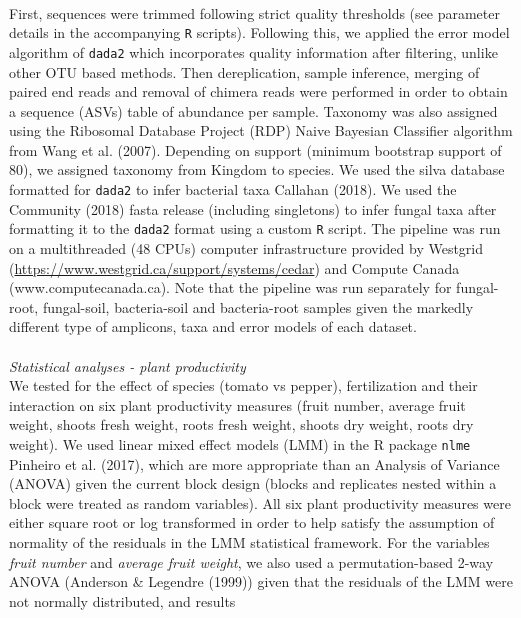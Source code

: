 \documentclass[11pt,]{article}
\begin{document}
\hspace*{0.333em}\\
First, sequences were trimmed following strict quality thresholds (see
parameter details in the accompanying \texttt{R} scripts). Following
this, we applied the error model algorithm of \texttt{dada2} which
incorporates quality information after filtering, unlike other OTU based
methods. Then dereplication, sample inference, merging of paired end
reads and removal of chimera reads were performed in order to obtain a
sequence (ASVs) table of abundance per sample. Taxonomy was also
assigned using the Ribosomal Database Project (RDP) Naive Bayesian
Classifier algorithm from Wang et al. (2007). Depending on support
(minimum bootstrap support of 80), we assigned taxonomy from Kingdom to
species. We used the silva database formatted for \texttt{dada2} to
infer bacterial taxa Callahan (2018). We used the Community (2018) fasta
release (including singletons) to infer fungal taxa after formatting it
to the \texttt{dada2} format using a custom \texttt{R} script. The
pipeline was run on a multithreaded (48 CPUs) computer infrastructure
provided by Westgrid
(\url{https://www.westgrid.ca/support/systems/cedar}) and Compute Canada
(www.computecanada.ca). Note that the pipeline was run separately for
fungal-root, fungal-soil, bacteria-soil and bacteria-root samples given
the markedly different type of amplicons, taxa and error models of each
dataset. ~\\
\hspace*{0.333em}\\
\emph{Statistical analyses - plant productivity}\\
We tested for the effect of species (tomato vs pepper), fertilization
and their interaction on six plant productivity measures (fruit number,
average fruit weight, shoots fresh weight, roots fresh weight, shoots
dry weight, roots dry weight). We used linear mixed effect models (LMM)
in the R package \texttt{nlme} Pinheiro et al. (2017), which are more
appropriate than an Analysis of Variance (ANOVA) given the current block
design (blocks and replicates nested within a block were treated as
random variables). All six plant productivity measures were either
square root or log transformed in order to help satisfy the assumption
of normality of the residuals in the LMM statistical framework. For the
variables \emph{fruit number} and \emph{average fruit weight}, we also
used a permutation-based 2-way ANOVA (Anderson \& Legendre (1999)) given
that the residuals of the LMM were not normally distributed, and results
\end{document}

